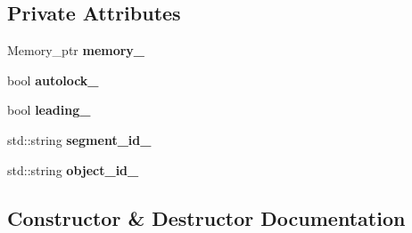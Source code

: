 \subsection*{Private Attributes}
\begin{DoxyCompactItemize}
\item 
Memory\+\_\+ptr {\bfseries memory\+\_\+}\hypertarget{classshared__memory_1_1Exchange__manager__producer_a67f2a2c049dabace06c85a35335d1614}{}\label{classshared__memory_1_1Exchange__manager__producer_a67f2a2c049dabace06c85a35335d1614}

\item 
bool {\bfseries autolock\+\_\+}\hypertarget{classshared__memory_1_1Exchange__manager__producer_a6d89b939f08bbb9180460a0fab2c877f}{}\label{classshared__memory_1_1Exchange__manager__producer_a6d89b939f08bbb9180460a0fab2c877f}

\item 
bool {\bfseries leading\+\_\+}\hypertarget{classshared__memory_1_1Exchange__manager__producer_a4c71d725b7b95e4dd00ecf68232d4ac9}{}\label{classshared__memory_1_1Exchange__manager__producer_a4c71d725b7b95e4dd00ecf68232d4ac9}

\item 
std\+::string {\bfseries segment\+\_\+id\+\_\+}\hypertarget{classshared__memory_1_1Exchange__manager__producer_a96ce58e9619ac28b31b46a81c53c20c2}{}\label{classshared__memory_1_1Exchange__manager__producer_a96ce58e9619ac28b31b46a81c53c20c2}

\item 
std\+::string {\bfseries object\+\_\+id\+\_\+}\hypertarget{classshared__memory_1_1Exchange__manager__producer_a57ea2e6076963223331f3b6e78cbbc05}{}\label{classshared__memory_1_1Exchange__manager__producer_a57ea2e6076963223331f3b6e78cbbc05}

\end{DoxyCompactItemize}


\subsection{Constructor \& Destructor Documentation}

